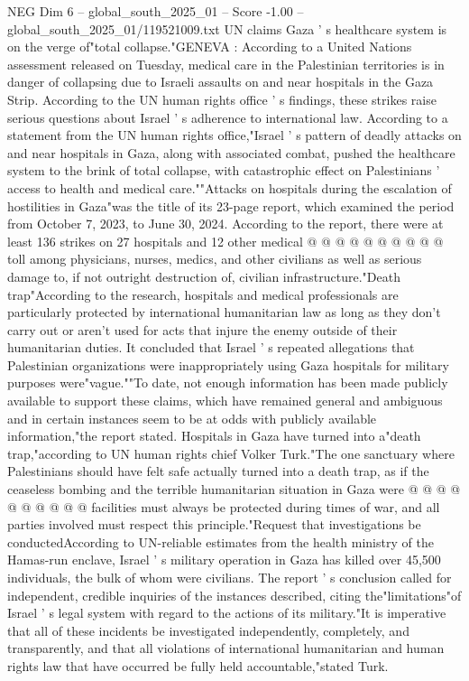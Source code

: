 \begin{textsample}{NEG Dim 6 – global\_south\_2025\_01 – Score -1.00 – global\_south\_2025\_01/119521009.txt}  \label{ex:f6_neg_088}
UN claims Gaza ' s healthcare system is on the verge of"total collapse."GENEVA : According to a United Nations assessment released on Tuesday, medical care in the Palestinian territories is in danger of collapsing due to Israeli assaults on and near hospitals in the Gaza Strip.
According to the UN human rights office ' s findings, these strikes raise serious questions about Israel ' s adherence to international law.
According to a statement from the UN human rights office,"Israel ' s pattern of deadly attacks on and near hospitals in Gaza, along with associated combat, pushed the healthcare system to the brink of total collapse, with catastrophic effect on Palestinians ' access to health and medical care.""Attacks on hospitals during the escalation of hostilities in Gaza"was the title of its 23-page report, which examined the period from October 7, 2023, to June 30, 2024.
According to the report, there were at least 136 strikes on 27 hospitals and 12 other medical @ @ @ @ @ @ @ @ @ @ toll among physicians, nurses, medics, and other civilians as well as serious damage to, if not outright destruction of, civilian infrastructure."Death trap"According to the research, hospitals and medical professionals are particularly protected by international humanitarian law as long as they don't carry out or aren't used for acts that injure the enemy outside of their humanitarian duties.
It concluded that Israel ' s repeated allegations that Palestinian organizations were inappropriately using Gaza hospitals for military purposes were"vague.""To date, not enough information has been made publicly available to support these claims, which have remained general and ambiguous and in certain instances seem to be at odds with publicly available information,"the report stated.
Hospitals in Gaza have turned into a"death trap,"according to UN human rights chief Volker Turk."The one sanctuary where Palestinians should have felt safe actually turned into a death trap, as if the ceaseless bombing and the terrible humanitarian situation in Gaza were @ @ @ @ @ @ @ @ @ @ facilities must always be protected during times of war, and all parties involved must respect this principle."Request that investigations be conductedAccording to UN-reliable estimates from the health ministry of the Hamas-run enclave, Israel ' s military operation in Gaza has killed over 45,500 individuals, the bulk of whom were civilians.
The report ' s conclusion called for independent, credible inquiries of the instances described, citing the"limitations"of Israel ' s legal system with regard to the actions of its military."It is imperative that all of these incidents be investigated independently, completely, and transparently, and that all violations of international humanitarian and human rights law that have occurred be fully held accountable,"stated Turk.

\end{textsample}
